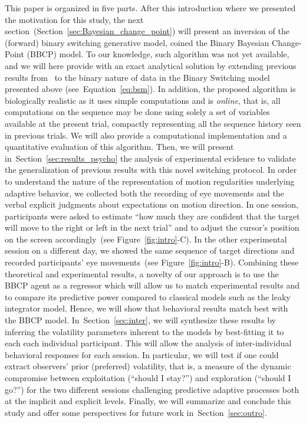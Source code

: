 \documentclass[10pt,letterpaper]{article}
\newcommand{\citet}[1]{\cite{#1}}
\newcommand{\seeFig}[1]{Figure~\ref{fig:#1}}
\newcommand{\seeEq}[1]{Equation~\ref{eq:#1}}
\newcommand{\seeSec}[1]{Section~\ref{sec:#1}}
\begin{document}
This paper is organized in five parts.
After this introduction where we presented the motivation for this study,
the next section~(\seeSec{Bayesian_change_point}) will present
an inversion of the (forward) binary switching generative model,
coined the Binary Bayesian Change-Point (BBCP) model.
To our knowledge, such algorithm was not yet available, and
we will here provide with an exact analytical solution
by extending previous results from~\citet{AdamsMackay2007}
to the binary nature of data in the Binary Switching model presented above (see~\seeEq{bsm}).
In addition, the proposed algorithm is biologically realistic
as it uses simple computations and is \emph{online},
that is, all computations on the sequence may be done
using solely a set of variables available at the present trial,
compactly representing all the sequence history seen in previous trials.
We will also provide a computational implementation
and a quantitative evaluation of this algorithm.
Then, we will present in~\seeSec{results_psycho} the analysis of experimental evidence
to validate the generalization of previous results %
with this novel switching protocol.
In order to understand the nature of
the representation of motion regularities underlying adaptive behavior,
we collected both
the recording of eye movements
and the verbal explicit judgments about expectations on motion direction.
In one session, participants were asked to estimate
``how much they are confident that
the target will move to the right or left in the next trial'' and
to adjust the cursor's position on the screen accordingly~(see \seeFig{intro}-C).
In the other experimental session on a different day,
we showed the same sequence of target directions and
recorded participants' eye movements~(see \seeFig{intro}-B).
Combining these theoretical and experimental results,
a novelty of our approach is to use the BBCP agent as a regressor
which will allow us to match experimental results
and to compare its predictive power compared to classical models such as the leaky integrator model.
Hence, we will show that behavioral results match best with the BBCP model.
In~\seeSec{inter}, we will synthesize these results
by inferring the volatility parameters inherent to the models
by best-fitting it to each each individual participant.
This will allow the analysis of inter-individual behavioral responses for each session.
In particular, we will test if one could extract observers' prior (preferred) volatility,
that is, a measure of the dynamic compromise between
exploitation (``should I stay?'') and exploration (``should I go?'')
for the two different sessions challenging predictive adaptive processes
both at the implicit and explicit levels.
Finally, we will summarize and conclude this study and
offer some perspectives for future work in~\seeSec{outro}.
%
\end{document}
